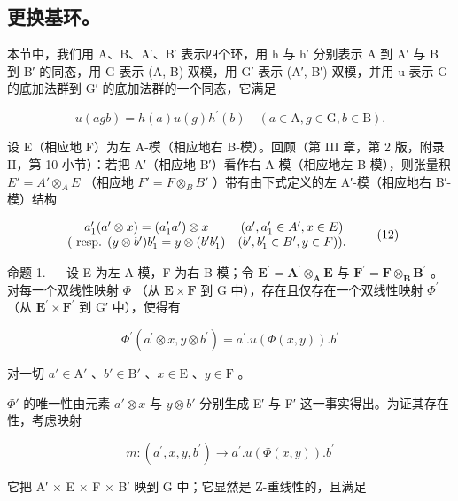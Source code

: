 \subsection{更换基环。}

本节中，我们用 A、B、A′、B′ 表示四个环，用 h 与 h′ 分别表示 A 到 A′ 与 B 到 B′ 的同态，用 G 表示 (A, B)-双模，用 G′ 表示 (A′, B′)-双模，并用 u 表示 G 的底加法群到 G′ 的底加法群的一个同态，它满足

\[
u (a g b) = h (a) u (g) h ^ {\prime} (b) \quad (a \in \mathrm{A}, g \in \mathrm{G}, b \in \mathrm{B}).\tag{11}
\]

设 E（相应地 F）为左 A-模（相应地右 B-模）。回顾（第 III 章，第 2 版，附录 II，第 10 小节）：若把 A′（相应地 B′）看作右 A-模（相应地左 B-模），则张量积 \(E' = A' \otimes_{A} E\) （相应地 \(F' = F \otimes_{B} B'\) ）带有由下式定义的左 A′-模（相应地右 B′-模）结构

\[
\begin{array}{c c} a _ {1} ^ {\prime} (a ^ {\prime} \otimes x) = (a _ {1} ^ {\prime} a ^ {\prime}) \otimes x & (a ^ {\prime}, a _ {1} ^ {\prime} \in A ^ {\prime}, x \in E) \\ (\text { resp. } (y \otimes b ^ {\prime}) b _ {1} ^ {\prime} = y \otimes (b ^ {\prime} b _ {1} ^ {\prime}) & (b ^ {\prime}, b _ {1} ^ {\prime} \in B ^ {\prime}, y \in F)). \end{array}\tag{12}
\]

命题 1. --- 设 E 为左 A-模，F 为右 B-模；令 \(\mathbf{E}^{\prime} = \mathbf{A}^{\prime}\otimes_{\mathbf{A}}\mathbf{E}\) 与 \(\mathbf{F}^{\prime} = \mathbf{F}\otimes_{\mathbf{B}}\mathbf{B}^{\prime}\) 。对每一个双线性映射 \(\Phi\) （从 \(\mathbf{E}\times \mathbf{F}\) 到 G 中），存在且仅存在一个双线性映射 \(\Phi^{\prime}\) （从 \(\mathbf{E}^{\prime}\times \mathbf{F}^{\prime}\) 到 G′ 中），使得有

\[
\Phi^ {\prime} (a ^ {\prime} \otimes x, y \otimes b ^ {\prime}) = a ^ {\prime}. u (\Phi (x, y)). b ^ {\prime}\tag{13}
\]

对一切 \(a' \in \mathrm{A}'\) 、\(b' \in \mathrm{B}'\) 、\(x \in \mathrm{E}\) 、\(y \in \mathrm{F}\) 。

\(\Phi'\) 的唯一性由元素 \(a' \otimes x\) 与 \(y \otimes b'\) 分别生成 E′ 与 F′ 这一事实得出。为证其存在性，考虑映射

\[
m: (a ^ {\prime}, x, y, b ^ {\prime}) \rightarrow a ^ {\prime}. u (\Phi (x, y)). b ^ {\prime}
\]

它把 A′ × E × F × B′ 映到 G 中；它显然是 Z-重线性的，且满足

